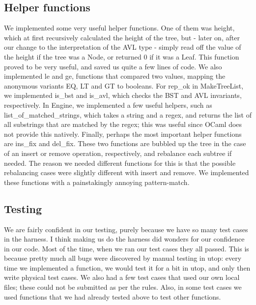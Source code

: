 \subsection{Helper functions}
We implemented some very useful helper functions. One of them was height, which at first recursively calculated the height of the tree, but - later on, after our change to the interpretation of the AVL type - simply read off the value of the height if the tree was a Node, or returned 0 if it was a Leaf. This function proved to be very useful, and saved us quite a few lines of code. We also implemented le and ge, functions that compared two values, mapping the anonymous variants EQ, LT and GT to booleans. For rep\_ok in MakeTreeList, we implemented is\_bst and is\_avl, which checks the BST and AVL invariants, respectively. In Engine, we implemented a few useful helpers, such as list\_of\_matched\_strings, which takes a string and a regex, and returns the list of all substrings that are matched by the regex; this was useful since OCaml does not provide this natively. Finally, perhaps the most important helper functions are ins\_fix and del\_fix. These two functions are bubbled up the tree in the case of an insert or remove operation, respectively, and rebalance each subtree if needed. The reason we needed different functions for this is that the possible rebalancing cases were slightly different with insert and remove. We implemented these functions with a painstakingly annoying pattern-match.

\subsection{Testing}
We are fairly confident in our testing, purely because we have so many test cases in the harness. I think making us do the harness did wonders for our confidence in our code. Most of the time, when we ran our test cases they all passed. This is because pretty much all bugs were discovered by manual testing in utop: every time we implemented a function, we would test it for a bit in utop, and only then write physical test cases. We also had a few test cases that used our own local files; these could not be submitted as per the rules. Also, in some test cases we used functions that we had already tested above to test other functions.

